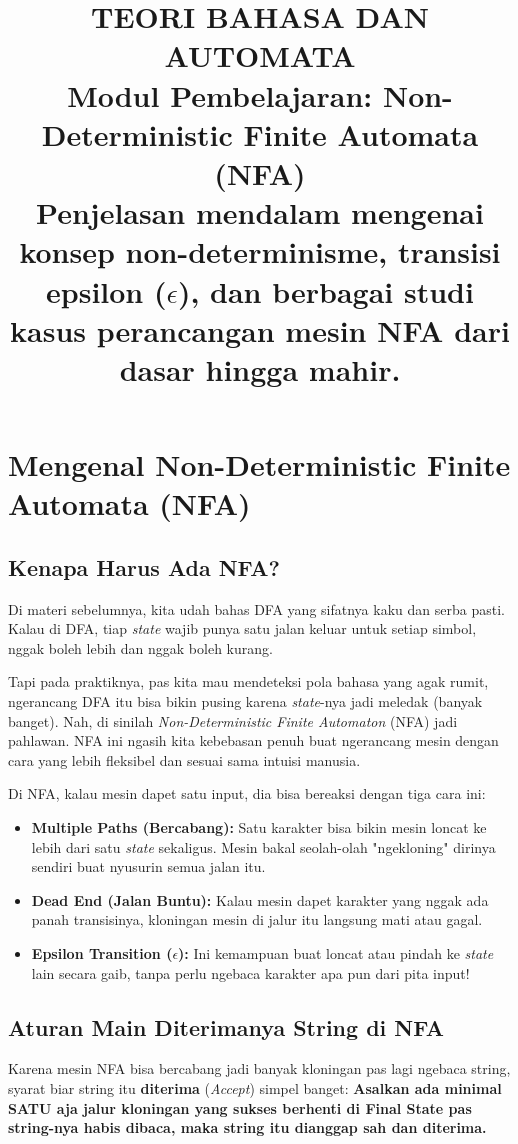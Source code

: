 \documentclass[12pt,a4paper]{article}
\title{
  {\LARGE\bfseries TEORI BAHASA DAN AUTOMATA}\\[0.5em]
  {\large Modul Pembelajaran: Non-Deterministic Finite Automata (NFA)}\\[0.8em]
  {\normalsize Penjelasan mendalam mengenai konsep non-determinisme, transisi epsilon ($\epsilon$), dan berbagai studi kasus perancangan mesin NFA dari dasar hingga mahir.}
}
\author{}
\date{}
\begin{document}
\maketitle
\thispagestyle{fancy}
\tableofcontents
\newpage


\section{Mengenal Non-Deterministic Finite Automata (NFA)}

\subsection{Kenapa Harus Ada NFA?}
Di materi sebelumnya, kita udah bahas DFA yang sifatnya kaku dan serba pasti. Kalau di DFA, tiap \textit{state} wajib punya satu jalan keluar untuk setiap simbol, nggak boleh lebih dan nggak boleh kurang.

Tapi pada praktiknya, pas kita mau mendeteksi pola bahasa yang agak rumit, ngerancang DFA itu bisa bikin pusing karena \textit{state}-nya jadi meledak (banyak banget). Nah, di sinilah \textit{Non-Deterministic Finite Automaton} (NFA) jadi pahlawan. NFA ini ngasih kita kebebasan penuh buat ngerancang mesin dengan cara yang lebih fleksibel dan sesuai sama intuisi manusia.

Di NFA, kalau mesin dapet satu input, dia bisa bereaksi dengan tiga cara ini:
\begin{itemize}
    \item \textbf{Multiple Paths (Bercabang):} Satu karakter bisa bikin mesin loncat ke lebih dari satu \textit{state} sekaligus. Mesin bakal seolah-olah "ngekloning" dirinya sendiri buat nyusurin semua jalan itu.
    \item \textbf{Dead End (Jalan Buntu):} Kalau mesin dapet karakter yang nggak ada panah transisinya, kloningan mesin di jalur itu langsung mati atau gagal.
    \item \textbf{Epsilon Transition ($\epsilon$):} Ini kemampuan buat loncat atau pindah ke \textit{state} lain secara gaib, tanpa perlu ngebaca karakter apa pun dari pita input!
\end{itemize}

\subsection{Aturan Main Diterimanya String di NFA}
Karena mesin NFA bisa bercabang jadi banyak kloningan pas lagi ngebaca string, syarat biar string itu \textbf{diterima} (\textit{Accept}) simpel banget:
\textbf{Asalkan ada minimal SATU aja jalur kloningan yang sukses berhenti di Final State pas string-nya habis dibaca, maka string itu dianggap sah dan diterima.}
\end{document}
